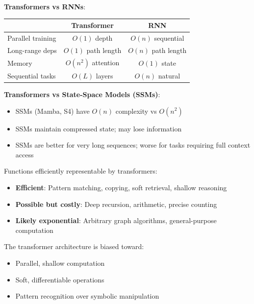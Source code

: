 \begin{remark}
    \textbf{Transformers vs RNNs}:
    \begin{center}
        \begin{tabular}{l|cc}
            & \textbf{Transformer} & \textbf{RNN} \\
            \hline
            Parallel training & $O(1)$ depth & $O(n)$ sequential \\
            Long-range deps & $O(1)$ path length & $O(n)$ path length \\
            Memory & $O(n^2)$ attention & $O(1)$ state \\
            Sequential tasks & $O(L)$ layers & $O(n)$ natural \\
        \end{tabular}
    \end{center}

    \textbf{Transformers vs State-Space Models (SSMs)}:
    \begin{itemize}
        \item SSMs (Mamba, S4) have $O(n)$ complexity vs $O(n^2)$
        \item SSMs maintain compressed state; may lose information
        \item SSMs are better for very long sequences; worse for tasks requiring full context access
    \end{itemize}
\end{remark}

\begin{remark}
    Functions efficiently representable by transformers:
    \begin{itemize}
        \item \textbf{Efficient}: Pattern matching, copying, soft retrieval, shallow reasoning
        \item \textbf{Possible but costly}: Deep recursion, arithmetic, precise counting
        \item \textbf{Likely exponential}: Arbitrary graph algorithms, general-purpose computation
    \end{itemize}

    The transformer architecture is biased toward:
    \begin{itemize}
        \item Parallel, shallow computation
        \item Soft, differentiable operations
        \item Pattern recognition over symbolic manipulation
    \end{itemize}
\end{remark}

